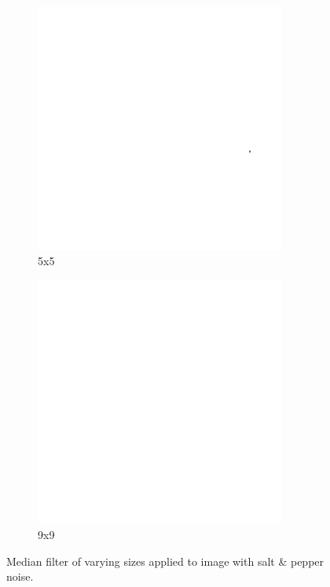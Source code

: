 \begin{figure}[h]
    \begin{subfigure}{0.3\textwidth}
        \includegraphics[width=0.9\textwidth]{../code/2_out/2-2_sp_5x5.png}
        \caption{5x5}
        \label{fig:2-2-1:3}
    \end{subfigure}
    \begin{subfigure}{0.3\textwidth}
        \includegraphics[width=0.9\textwidth]{../code/2_out/2-2_sp_9x9.png}
        \caption{9x9}
        \label{fig:2-2-1:4}
    \end{subfigure}

    \caption{Median filter of varying sizes applied to image with salt \& pepper noise.}
    \label{fig:2-2-1}
\end{figure}


